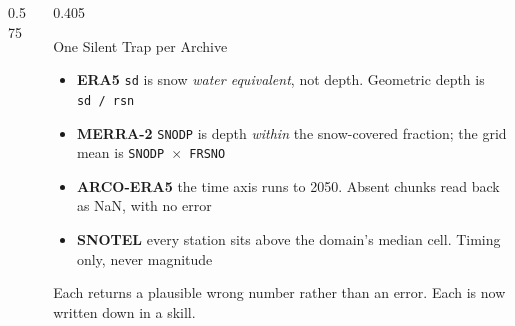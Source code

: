 \begin{frame}[t]
\begin{columns}[T,onlytextwidth]
\begin{column}{0.575\textwidth}
\end{column}
\begin{column}{0.405\textwidth}
\begin{alertblock}{One Silent Trap per Archive}
\scriptsize
\begin{itemize}\itemsep0.34em
  \item \textbf{ERA5} \texttt{sd} is snow \emph{water equivalent}, not depth.
        Geometric depth is \texttt{sd\,/\,rsn}
  \item \textbf{MERRA-2} \texttt{SNODP} is depth \emph{within} the snow-covered
        fraction; the grid mean is \texttt{SNODP\,$\times$\,FRSNO}
  \item \textbf{ARCO-ERA5} the time axis runs to 2050. Absent chunks read back
        as NaN, with no error
  \item \textbf{SNOTEL} every station sits above the domain's median cell.
        Timing only, never magnitude
\end{itemize}
\end{alertblock}
\vspace{0.25em}
{\raggedright\scriptsize\color{accentDeep}
Each returns a plausible wrong number rather than an error. Each is now
written down in a skill.\par}
\end{column}
\end{columns}
\end{frame}

